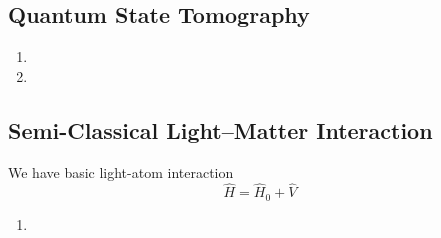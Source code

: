 \subsection{Quantum State Tomography}

\begin{enumerate}[label=(\alph*)]
	\item 
	\item 
\end{enumerate}


\subsection{Semi-Classical Light–Matter Interaction}

We have basic light-atom interaction
\begin{equation*}
	\hat{H} = \hat{H}_0 + \hat{V}
\end{equation*}

\begin{enumerate}[label=(\alph*)]
	\item 
\end{enumerate}

